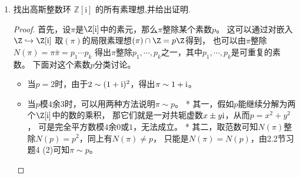 \begin{enumerate}
\begin{proof}
\begin{enumerate}[label=(\roman*)]
    对于$Q$中的元素$f(x)/m$，其中$f(x)\in\Z[x],m\in\Z\setminus\{0\}$，
    有$f(x) \in Q^c$，进而$f(x)/m \in Q^{ce}$。
    \end{enumerate}
    回到原题. 对于$\Z[x]$中的素理想$P$，考察其（在$\Z$中的局限理想）$P\cap\Z$。
    容易说明$P\cap\Z$是$\Z$中的素理想，那么就是$\{0\}$或$p\Z$，其中$p$是素数。
    \begin{enumerate}[label=(\arabic*)]
    \item 如果$P\cap\Z=\{0\}$，
    那么引理表明$P$必然是$\mathbb{Q}[x]$中某个素理想$Q$的局限。
    当$Q=\{0\}$时$P=Q^c=\{0\}$；下设$Q\ne\{0\}$。
    这时$Q$由某个非零的不可约多项式$f(x)\in\mathbb{Q}[x]$生成，
    通过对$f(x)$乘上一个有理数，不妨设$f(x)$是$\Z[x]$中的本原多项式。
    现在来看$Q^c$中有哪些元素，
    也就是说$Q=\{f(x)q(x) \mid q(x)\in\mathbb{Q}[x]\}$中有哪些整系数多项式。
    由命题7.7 (1)，当$f(x)q(x)\in\Z[x]$时有$r,s\in\mathbb{Q}$
    使得$rf(x),sq(x)\in\Z[x]$且$rs=1$，
    $f(x)$是本原的说明$r$是整数，进而$q(x)=r(sq(x))\in\Z[x]$；
    反过来，$q(x)\in\Z[x]$时当然有$f(x)q(x)\in\Z[x]$。
    由此可知$P=Q^c$就是本原多项式$f(x)$在$\Z[x]$中生成的理想。
    \item 如果$P\cap\Z=p\Z$，类似于定理3.6不难说明「商掉$I$」及「取原象」是
    \[\{P\in\operatorname{Spec}(R) \mid P \supseteq I\}
    \rightleftharpoons\operatorname{Spec}(R/I)\]
    之间的一一对应，取$R=\Z[x],I=(p)$可知这时$P$
    是$\Z[x]/(p)\cong\mathbb{F}_p[x]$中的素理想$Q$的原象。
    当$Q=\{\bar{0}\}$时$P=(p)$；下设$Q\ne\{\bar{0}\}$。
    这时$Q$在同构意义下由$\mathbb{F}_p[x]$中的不可约多项式$\bar{f}(x)$生成，
    那么$P=(p,f(x))$。
    \end{enumerate}
    最终的答案是，$\Z[x]$的素理想有四类：$\{0\}$，由素数$p$生成的主理想$(p)$，
    由不可约的本原多项式$f(x)$生成的主理想$(f(x))$，
    以及由素数$p$和模$p$后不可约的多项式$f(x)$生成的理想$(p,f(x))$。
    值得一提的是\cite{Mu}在II.1节的Example H中为这个$2$维概型画了一幅耐人寻味的图示，
    对其中微言大义的解读可参考\href{http://www.neverendingbooks.org/mumfords-treasure-map/}{Mumford的藏宝图}。
\end{proof}

\item 找出高斯整数环 $ \mathbb{Z}[\mathrm{i}] $ 的所有素理想,并给出证明.
\begin{proof}
    首先，设$\pi$是$\Z[{\rm i}]$中的素元，那么$\pi$整除某个素数$p$。
    这可以通过对嵌入$\Z\hookrightarrow\Z[{\rm i}]$
    取$(\pi)$的局限素理想$(\pi)\cap\Z=p\Z$得到，
    也可以由$\pi$整除$N(\pi)=\pi\bar{\pi}=p_1 \cdots p_k$
    得出$\pi$整除$p_1,\cdots,p_k$之一，其中$p_1,\cdots,p_k$是可重复的素数。
    下面对这个素数$p$分类讨论。
    \begin{itemize}
    \item 当$p=2$时，由于$2\sim(1+{\rm i})^2$，得出$\pi\sim1+{\rm i}$。
    \item 当$p$模$4$余$3$时，可以用两种方法说明$\pi \sim p$。
    * 其一，假如$p$能继续分解为两个$\Z[{\rm i}]$中的数的乘积，
    那它们就是一对共轭虚数$x \pm y{\rm i}$，从而$p=x^2+y^2$，
    可是完全平方数模$4$余$0$或$1$，无法成立。
    * 其二，取范数可知$N(\pi)$整除$N(p)=p^2$，同上有$N(\pi) \ne p$，
    只能是$N(\pi)=N(p)$，由2.2节习题4 (2)可知$\pi \sim p$。


\end{itemize}
\end{proof}
\end{enumerate}
